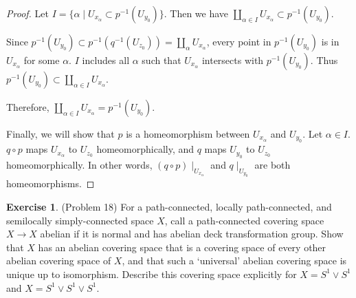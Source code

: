 \documentclass[12pt, psamsfonts]{amsart}
\theoremstyle{definition}
\newtheorem*{exer}{Exercise}
\theoremstyle{remark}
\numberwithin{equation}{section}
\begin{document}
\begin{proof}
  Let $I = \{ \alpha \mid U_{x_{\alpha}} \subset p^{-1}(U_{y_0}) \}$.
  Then we have $\coprod_{\alpha \in I} U_{x_{\alpha}} \subset p^{-1}(U_{y_0})$.

  Since $p^{-1}(U_{y_0}) \subset p^{-1}(q^{-1}(U_{z_0})) = \coprod_{\alpha} U_{x_{\alpha}}$, every point in $p^{-1}(U_{y_0})$ is in $U_{x_{\alpha}}$ for some $\alpha$.
  $I$ includes all $\alpha$ such that $U_{x_{\alpha}}$ intersects with $p^{-1}(U_{y_0})$.
  Thus $p^{-1}(U_{y_0}) \subset \coprod_{\alpha \in I} U_{x_{\alpha}}$.

  Therefore, $\coprod_{\alpha \in I} U_{x_{\alpha}} = p^{-1}(U_{y_0})$.


  Finally, we will show that $p$ is a homeomorphism between $U_{x_{\alpha}}$ and $U_{y_0}$.
  Let $\alpha \in I$.
  $q \circ p$ maps $U_{x_{\alpha}}$ to $U_{z_0}$ homeomorphically, and $q$ maps $U_{y_0}$ to $U_{z_0}$ homeomorphically.
  In other words, $(q \circ p) \mid_{U_{x_{\alpha}}}$ and $q \mid_{U_{y_0}}$ are both homeomorphisms.
\end{proof}

\begin{exer}{(Problem 18)}
  For a path-connected, locally path-connected, and semilocally simply-connected space $X$, call a path-connected covering space $X \rightarrow X$ abelian if it is normal and has abelian deck transformation group.
  Show that $X$ has an abelian covering space that is a covering space of every other abelian covering space of $X$, and that such a `universal' abelian covering space is unique up to isomorphism.
  Describe this covering space explicitly for $X = S^1 \vee S^1$ and $X = S^1 \vee S^1 \vee S^1$.
\end{exer}
\end{document}
